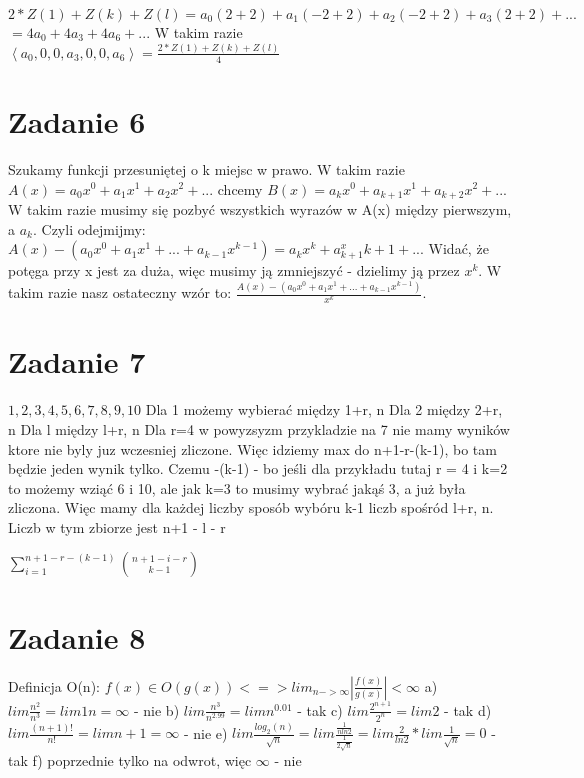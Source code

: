 \documentclass[12pt]{article}
\newcommand{\abs}[1]{\left| #1 \right|}					%
\newcommand{\sequence}[1]{\left\langle #1 \right\rangle} %
\begin{document}
$2*Z(1) + Z(k) + Z(l) = a_0(2+2) + a_1(-2 + 2) + a_2(-2+2) + a_3(2+2) + ...$ 
$= 4a_0 + 4a_3 + 4a_6 + ...$
W takim razie
$\sequence{a_0, 0, 0, a_3, 0, 0, a_6} = \frac{2*Z(1)+Z(k)+Z(l)}{4}$

\section{Zadanie 6}
Szukamy funkcji przesuniętej o k miejsc w prawo. 
W takim razie
$A(x) = a_0x^0 + a_1x^1 + a_2x^2 + ... $
chcemy
$B(x) = a_kx^0 + a_{k+1}x^1 + a_{k+2}x^2 + ...$
W takim razie musimy się pozbyć wszystkich wyrazów w A(x) między pierwszym, a $a_k$.
Czyli odejmijmy:
$A(x) - (a_0x^0+a_1x^1+...+a_{k-1}x^{k-1}) = a_kx^k+a_{k+1}^x{k+1} + ...$
Widać, że potęga przy x jest za duża, więc musimy ją zmniejszyć - dzielimy ją przez $x^k$. W takim razie nasz ostateczny wzór to:
$\frac{A(x) - (a_0x^0+a_1x^1+...+a_{k-1}x^{k-1})}{x^k}$.

\section{Zadanie 7}
${1, 2, 3, 4, 5, 6, 7, 8, 9, 10}$
Dla 1 możemy wybierać między {1+r, n}
Dla 2 między {2+r, n}
Dla l między {l+r, n}
Dla r=4 w powyzsyzm przykladzie na 7 nie mamy wyników ktore nie byly juz wczesniej zliczone. Więc idziemy max do n+1-r-(k-1), bo tam będzie jeden wynik tylko. Czemu -(k-1) - bo jeśli dla przykładu tutaj r = 4 i k=2 to możemy wziąć 6 i 10, ale jak k=3 to musimy wybrać jakąś 3, a już była zliczona.
Więc mamy dla każdej liczby sposób wybóru k-1 liczb spośród {l+r, n}. Liczb w tym zbiorze jest n+1 - l - r

$\sum_{i=1}^{n+1-r-(k-1)} \binom{n+1-i-r}{k-1}$

\section{Zadanie 8}
Definicja O(n): $f(x) \in O(g(x)) <=> lim_{n->\infty} \abs{\frac{f(x)}{g(x)}} < \infty$
a) $lim \frac{n^2}{n^3} = lim{1}{n} = \infty$ - nie
b) $lim \frac{n^3}{n^{2.99}} = lim n^{0.01}$ - tak 
c) $lim \frac{2^{n+1}}{2^n} = lim 2$ - tak
d) $lim \frac{(n+1)!}{n!} = lim n+1 = \infty$ - nie
e) $lim \frac{log_2(n)}{\sqrt{n}} = lim \frac{\frac{1}{nln2}}{\frac{1}{2\sqrt{n}}} = lim \frac{2}{ln2} * lim \frac{1}{\sqrt{n}} = 0$ - tak
f) poprzednie tylko na odwrot, więc $\infty$ - nie
\end{document}
